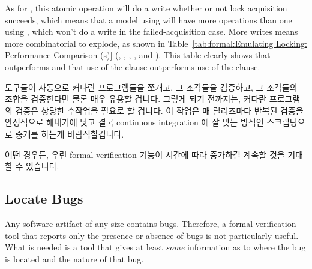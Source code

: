 {	As for , this atomic operation will do a
	write whether or not lock acquisition succeeds, which means
	that a model using  will have more operations
	than one using , which won't do a write
	in the failed-acquisition case.
	More writes means more combinatorial to explode, as shown in
	Table~\ref{tab:formal:Emulating Locking: Performance Comparison (s)}
	(,
	,
	,
	, and
	).
	This table clearly shows that 
	outperforms  and that use of the
	 clause outperforms use of the  clause.
	\fi
} \QuickQuizEnd

도구들이 자동으로 커다란 프로그램들을 쪼개고, 그 조각들을 검증하고, 그 조각들의
조합을 검증한다면 물론 매우 유용할 겁니다.
그렇게 되기 전까지는, 커다란 프로그램의 검증은 상당한 수작업을 필요로 할
겁니다.
이 작업은 매 릴리즈마다 반복된 검증을 안정적으로 해내기에 낫고 결국 continuous
integration 에 잘 맞는 방식인 스크립팅으로 중개를 하는게 바람직할겁니다.

어떤 경우든, 우린 formal-verification 기능이 시간에 따라 증가하길 계속할 것을
기대할 수 있습니다.
\iffalse

It would of course be quite useful for tools to automatically divide
up large programs, verify the pieces, and then verify the combinations
of pieces.
In the meantime, verification of large programs will require significant
manual intervention.
This intervention will preferably mediated by scripting, the better to
reliably carry out repeated verifications on each release, and
preferably eventually in a manner well-suited for continuous integration.

In any case, we can expect formal-verification capabilities to continue
to increase over time.
\fi

\subsection{Locate Bugs}
\label{sec:formal:Locate Bugs}

Any software artifact of any size contains bugs.
Therefore, a formal-verification tool that reports only the
presence or absence of bugs is not particularly useful.
What is needed is a tool that gives at least \emph{some} information
as to where the bug is located and the nature of that bug.

